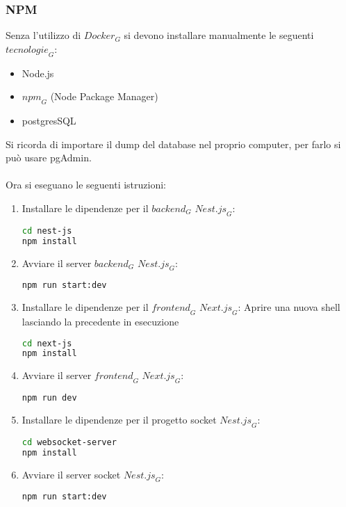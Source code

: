 \newpage
\subsubsection{NPM}
Senza l'utilizzo di $\textit{Docker}_G$ si devono installare manualmente le seguenti $\textit{tecnologie}_G$:
\begin{itemize}
    \item Node.js
    \item $\textit{npm}_G$ (Node Package Manager)
    \item postgresSQL
\end{itemize}
Si ricorda di importare il dump del database nel proprio computer, per farlo si può usare pgAdmin.\\ \\ Ora si eseguano le seguenti istruzioni:
\begin{enumerate}
\item Installare le dipendenze per il $\textit{backend}_G$ $\textit{Nest.js}_G$:
\begin{lstlisting}[language=bash]
cd nest-js
npm install
\end{lstlisting}

\item Avviare il server $\textit{backend}_G$ $\textit{Nest.js}_G$:
\begin{lstlisting}[language=bash]
npm run start:dev
\end{lstlisting}

\item Installare le dipendenze per il $\textit{frontend}_G$ $\textit{Next.js}_G$: Aprire una nuova shell lasciando la precedente in esecuzione
\begin{lstlisting}[language=bash]
cd next-js
npm install
\end{lstlisting}

\item Avviare il server $\textit{frontend}_G$ $\textit{Next.js}_G$:
\begin{lstlisting}[language=bash]
npm run dev
\end{lstlisting}

\item Installare le dipendenze per il progetto socket $\textit{Nest.js}_G$:
\begin{lstlisting}[language=bash]
cd websocket-server
npm install
\end{lstlisting}

\item Avviare il server socket $\textit{Nest.js}_G$:
\begin{lstlisting}[language=bash]
npm run start:dev
\end{lstlisting}


\end{enumerate}
